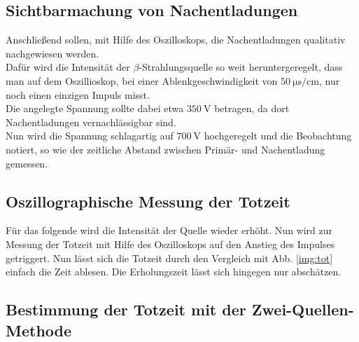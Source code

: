 \subsection{Sichtbarmachung von Nachentladungen}

\noindent
Anschließend sollen, mit Hilfe des Oszilloskops, die Nachentladungen qualitativ nachgewiesen werden.\\
Dafür wird die Intensität der $\beta$-Strahlungsquelle so weit heruntergeregelt, dass man auf dem Oszillioskop, bei einer Ablenkgeschwindigkeit von $\SI{50}{\micro\second\per\centi\metre}$, 
nur noch einen einzigen Impuls misst. \\
Die angelegte Spannung sollte dabei etwa $\SI{350}{\volt}$ betragen, da dort Nachentladungen vernachlässigbar sind.\\
Nun wird die Spannung schlagartig auf $\SI{700}{\volt}$ hochgeregelt und die Beobachtung notiert, so wie der zeitliche Abstand zwischen Primär- und Nachentladung gemessen.

\subsection{Oszillographische Messung der Totzeit}

Für das folgende wird die Intensität der Quelle wieder erhöht.
Nun wird zur Messung der Totzeit mit Hilfe des Oszilloskops auf den Anstieg des Impulses getriggert.
Nun lässt sich die Totzeit durch den Vergleich mit Abb. \ref{img:tot} einfach die Zeit ablesen. Die Erholungszeit lässt sich hingegen nur abschätzen.

\subsection{Bestimmung der Totzeit mit der Zwei-Quellen-Methode}

